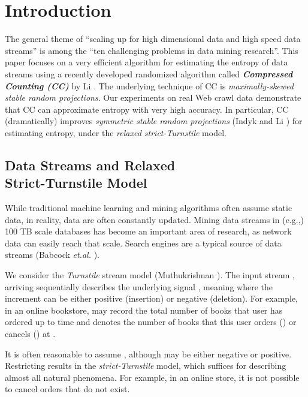 \documentclass{sig-alternate}
\begin{document}
\section{Introduction}

The general theme of ``scaling up for high dimensional data and high speed data streams'' is among the  ``ten challenging problems in data mining research''\cite{Article:ICDM10}. This paper focuses on a very efficient algorithm for estimating the entropy of data streams using a recently developed randomized algorithm called \textbf{\em Compressed Counting (CC)} by Li \cite{Article:Li_CC_v0,Article:Li_CC,Report:Li_CC_oq}. The underlying technique of CC is {\em maximally-skewed stable random projections}. Our experiments on real Web crawl data demonstrate that CC can approximate entropy with very high accuracy. In particular, CC (dramatically) improves {\em symmetric stable random projections} (Indyk \cite{Article:Indyk_JACM06} and Li \cite{Proc:Li_SODA08}) for estimating entropy, under the {\em relaxed strict-Turnstile} model.


\subsection{Data Streams and Relaxed\\ Strict-Turnstile Model}

While traditional machine learning and mining algorithms often assume static data, in reality, data are often constantly updated. Mining data streams\cite{Book:Henzinger_99,Proc:Babcock_PODS02,Proc:Aggarwal_KDD04,Article:Muthukrishnan_05} in (e.g.,) 100 TB scale  databases has become an important area of research, as network data can easily reach that scale\cite{Article:ICDM10}. Search engines are a typical source of data streams (Babcock {\em et.al.} \cite{Proc:Babcock_PODS02}).

We consider the  {\em Turnstile}  stream model (Muthukrishnan \cite{Article:Muthukrishnan_05}). The input  stream ,  arriving sequentially describes the underlying signal , meaning
 where the increment  can be either positive (insertion) or negative (deletion). For example, in an online bookstore,  may record the total number of books that user  has ordered up to time  and  denotes the number of books that this user orders () or cancels () at  .

It is often reasonable to assume , although  may be either negative or positive. Restricting  results in the {\em strict-Turnstile} model, which suffices for describing almost all natural phenomena. For example, in an online store, it is  not possible to cancel orders that do not exist.
\end{document}
